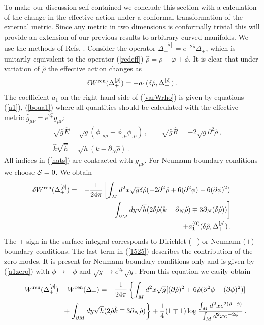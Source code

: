 \documentclass[a4paper,12pt]{article}
\begin{document}
To make our discussion self-contained we conclude this section
with a calculation of the change in the effective action under
a conformal transformation of the external metric. Since any 
metric in two dimensions is conformally trivial this will
provide an extension of our previous results 
to arbitrary curved manifolds. We use the methods of Refs. 
\cite{Kummer:1997jr,Alvarez:1983zi,Dowker:1990ue,Tseytlin:2000jr}.
Consider the operator $\Delta^{[\hat \rho]}_+=e^{-2\hat\rho}\Delta_+$,
which  is unitarily equivalent to the operator (\ref{redeff})
$\hat \rho =\rho -\varphi +\phi$. It is clear that under variation
of $\hat \rho$ the effective action changes as
\begin{equation}
\delta W^{\mbox{\scriptsize ren}}(\Delta^{[\hat \rho]}_+)=
-a_1(\delta\hat\rho ,\Delta^{[\hat \rho]}_+) \,.
\label{varWrho}
\end{equation}
The coefficient $a_1$ on the right hand side of (\ref{varWrho})
is given by equations (\ref{a1}), (\ref{boua1}) where all
quantities should be calculated with the effective metric
$\hat g_{\mu\nu}=e^{2\hat\rho}g_{\mu\nu}$:
\begin{eqnarray}
&&\sqrt{\hat g} \hat E=\sqrt{g}(\phi_{,\mu\mu}-\phi_{,\mu}\phi_{,\mu})\,,
\qquad \sqrt{\hat g} \hat R =-2\sqrt{g}\partial^2\hat\rho \,,\nonumber \\
&&\hat k\sqrt{\hat h}=\sqrt{h} (k-\partial_N \hat\rho )\,.
\label{hats}
\end{eqnarray}
All indices in (\ref{hats}) are contracted with $g_{\mu\nu}$.
For Neumann boundary conditions we choose ${\cal S}=0$.
We obtain
\begin{eqnarray}
\delta W^{\mbox{\scriptsize ren}}(\Delta^{[\hat \rho]}_+)&=&
-\frac 1{24\pi}\left[ \int_M d^2x\sqrt{g} \delta\hat\rho
(-2\partial^2\hat\rho +6(\partial^2\phi )-6(\partial\phi )^2 )
\right. \nonumber \\
&&+\left. \int_{\partial M} dy\sqrt{h}
(2\delta\hat\rho (k-\partial_N\hat\rho )\mp 3\partial_N
(\delta\hat\rho ))\right]   \nonumber \\
&&+a_1^{(0)}(\delta\hat\rho ,\Delta^{[\hat \rho]}_+)\,.
\label{1525}
\end{eqnarray}
The $\mp$ sign in the surface integral corresponds to
Dirichlet ($-$) or Neumann ($+$) boundary conditions.
The last term in (\ref{1525}) describes the contribution of the
zero modes. It is present for Neumann boundary conditions
only and is given by (\ref{a1zero}) with $\phi\to -\phi$
and $\sqrt{g}\to e^{2\hat\rho }\sqrt{g}$. From this equation
we easily obtain
\begin{eqnarray}
&&W^{\mbox{\scriptsize ren}}(\Delta^{[\hat \rho]}_+)-
W^{\mbox{\scriptsize ren}}(\Delta_+) =
-\frac 1{24\pi}\left\{ \int_M d^2x\sqrt{g}
[(\partial\hat\rho )^2 +6\hat\rho (\partial^2\phi -(\partial\phi )^2)]
\right.\nonumber \\
&&\qquad\qquad +\left. \int_{\partial M} dy\sqrt{h}
(2\hat\rho\hat{k} \mp 3\partial_N \hat\rho )\right\} +
 \frac 14 (1\mp 1) \log 
\frac{\int_M d^2x e^{2(\hat{\rho} -\phi )}}{\int_M d^2x 
e^{ -2\phi }} \,.
\label{1620}
\end{eqnarray}
\end{document}

